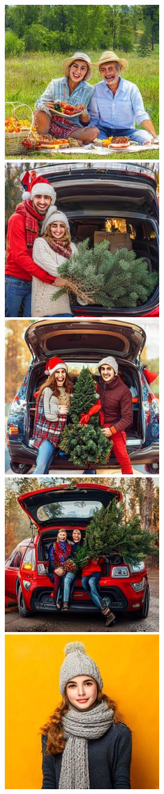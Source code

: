 \begin{figure}[h!]
\begin{subfigure}[t]{0.32\linewidth}
    	\includegraphics[width=0.32\linewidth]{figs/samples_appendix_4/adjmat_cfg_2_ode_prompt_51_image_2.jpg}\\ 
    	\includegraphics[width=0.32\linewidth]{figs/samples_appendix_4/adjmat_cfg_2_ode_prompt_58_image_0.jpg}\;%
    	\includegraphics[width=0.32\linewidth]{figs/samples_appendix_4/adjmat_cfg_2_ode_prompt_58_image_1.jpg}\;%
    	\includegraphics[width=0.32\linewidth]{figs/samples_appendix_4/adjmat_cfg_2_ode_prompt_58_image_2.jpg}\\ 
    	\includegraphics[width=0.32\linewidth]{figs/samples_appendix_4/adjmat_cfg_2_ode_prompt_61_image_0.jpg}\;%

\end{subfigure}
\end{figure}
